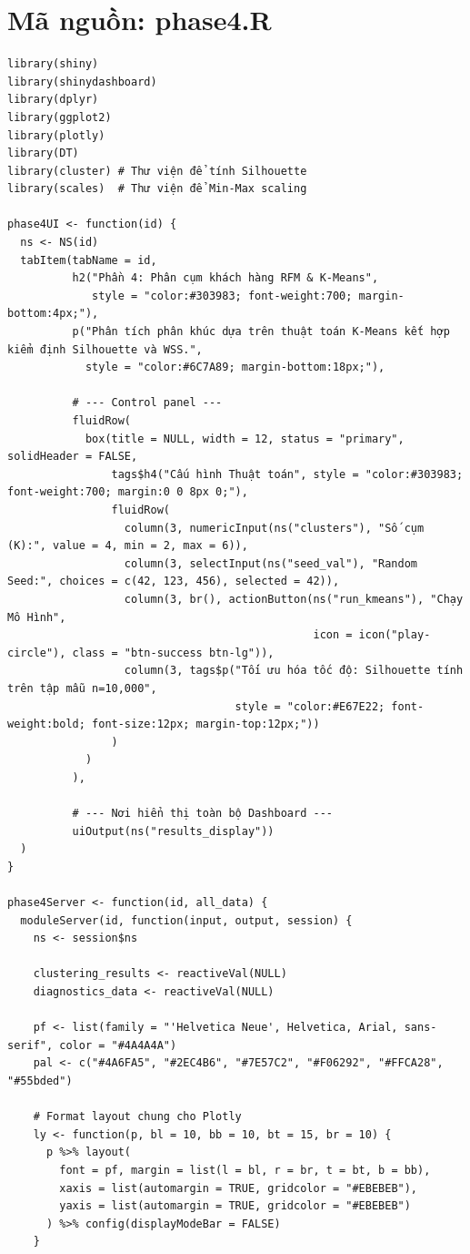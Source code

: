 \documentclass[12pt, a4paper]{article}
\begin{document}
\section{Mã nguồn: phase4.R}
\begin{lstlisting}
library(shiny)
library(shinydashboard)
library(dplyr)
library(ggplot2)
library(plotly)
library(DT)
library(cluster) # Thư viện để tính Silhouette
library(scales)  # Thư viện để Min-Max scaling

phase4UI <- function(id) {
  ns <- NS(id)
  tabItem(tabName = id,
          h2("Phần 4: Phân cụm khách hàng RFM & K-Means",
             style = "color:#303983; font-weight:700; margin-bottom:4px;"),
          p("Phân tích phân khúc dựa trên thuật toán K-Means kết hợp kiểm định Silhouette và WSS.",
            style = "color:#6C7A89; margin-bottom:18px;"),
          
          # --- Control panel ---
          fluidRow(
            box(title = NULL, width = 12, status = "primary", solidHeader = FALSE,
                tags$h4("Cấu hình Thuật toán", style = "color:#303983; font-weight:700; margin:0 0 8px 0;"),
                fluidRow(
                  column(3, numericInput(ns("clusters"), "Số cụm (K):", value = 4, min = 2, max = 6)),
                  column(3, selectInput(ns("seed_val"), "Random Seed:", choices = c(42, 123, 456), selected = 42)),
                  column(3, br(), actionButton(ns("run_kmeans"), "Chạy Mô Hình",
                                               icon = icon("play-circle"), class = "btn-success btn-lg")),
                  column(3, tags$p("Tối ưu hóa tốc độ: Silhouette tính trên tập mẫu n=10,000",
                                   style = "color:#E67E22; font-weight:bold; font-size:12px; margin-top:12px;"))
                )
            )
          ),
          
          # --- Nơi hiển thị toàn bộ Dashboard ---
          uiOutput(ns("results_display"))
  )
}

phase4Server <- function(id, all_data) {
  moduleServer(id, function(input, output, session) {
    ns <- session$ns
    
    clustering_results <- reactiveVal(NULL)
    diagnostics_data <- reactiveVal(NULL)
    
    pf <- list(family = "'Helvetica Neue', Helvetica, Arial, sans-serif", color = "#4A4A4A")
    pal <- c("#4A6FA5", "#2EC4B6", "#7E57C2", "#F06292", "#FFCA28", "#55bded")
    
    # Format layout chung cho Plotly
    ly <- function(p, bl = 10, bb = 10, bt = 15, br = 10) {
      p %>% layout(
        font = pf, margin = list(l = bl, r = br, t = bt, b = bb),
        xaxis = list(automargin = TRUE, gridcolor = "#EBEBEB"),
        yaxis = list(automargin = TRUE, gridcolor = "#EBEBEB")
      ) %>% config(displayModeBar = FALSE)
    }
    

\end{lstlisting}
\end{document}
